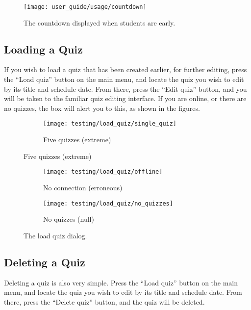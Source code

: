 \begin{figure}[h!]
  \centering
  \texttt{[image: user\_guide/usage/countdown]}
  \caption{The countdown displayed when students are early.}
\end{figure}

\subsection{Loading a Quiz} %
\label{sub:loading_a_quiz}
If you wish to load a quiz that has been created earlier, for further editing, press the ``Load quiz'' button on the main menu, and locate the quiz you wish to edit by its title and schedule date. From there, press the ``Edit quiz'' button, and you will be taken to the familiar quiz editing interface. If you are online, or there are no quizzes, the box will alert you to this, as shown in the figures.

\begin{figure}[!htbp]
\centering
\begin{subfigure}{0.5\textwidth}
  \centering
  \texttt{[image: testing/load\_quiz/single\_quiz]}
  \caption{Five quizzes (extreme)}
  \label{fig:sub2}
\end{subfigure}
\label{fig:test}
\end{figure}
\begin{figure}[!htbp]
\centering
\begin{subfigure}{0.5\textwidth}
  \centering
  \texttt{[image: testing/load\_quiz/offline]}
  \setcounter{subfigure}{2}%
  \caption{No connection (erroneous)}
  \label{fig:sub1}
\end{subfigure}%
\begin{subfigure}{0.5\textwidth}
  \centering
  \texttt{[image: testing/load\_quiz/no\_quizzes]}
  \setcounter{subfigure}{3}%
  \caption{No quizzes (null)}
  \label{fig:sub2}
\end{subfigure}
\caption{The load quiz dialog.}
\label{fig:test}
\end{figure}

\subsection{Deleting a Quiz} %
\label{sub:deleting_a_quiz}
Deleting a quiz is also very simple. Press the ``Load quiz'' button on the main menu, and locate the quiz you wish to edit by its title and schedule date. From there, press the ``Delete quiz'' button, and the quiz will be deleted.

